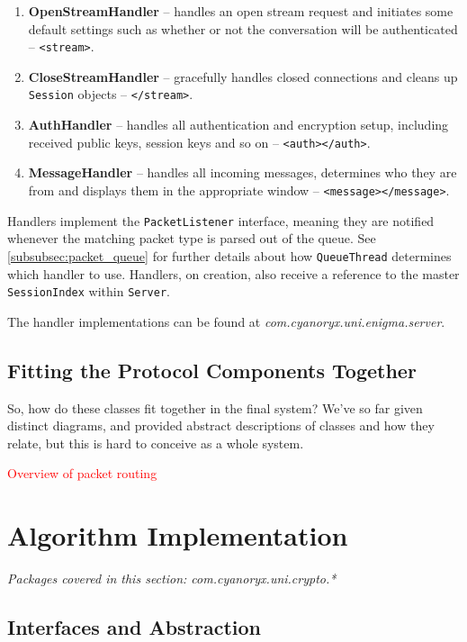     \begin{enumerate}
      \item \textbf{OpenStreamHandler} -- handles an open stream request and initiates some default settings such as whether or not the conversation will be authenticated -- \verb!<stream>!.
      \item \textbf{CloseStreamHandler} -- gracefully handles closed connections and cleans up \verb!Session! objects -- \verb!</stream>!.
      \item \textbf{AuthHandler} -- handles all authentication and encryption setup, including received public keys, session keys and so on -- \verb!<auth></auth>!.
      \item \textbf{MessageHandler} -- handles all incoming messages, determines who they are from and displays them in the appropriate window -- \verb!<message></message>!.
    \end{enumerate}
    
    Handlers implement the \verb!PacketListener! interface, meaning they are notified whenever the matching packet type is parsed out of the queue. See \textsection\ref{subsubsec:packet_queue} for further details about how \verb!QueueThread! determines which handler to use. Handlers, on creation, also receive a reference to the master \verb!SessionIndex! within \verb!Server!.
    
    The handler implementations can be found at \emph{com.cyanoryx.uni.enigma.server}.
    
    \subsection{Fitting the Protocol Components Together}
    \label{subsec:combined}
    
    So, how do these classes fit together in the final system? We've so far given distinct diagrams, and provided abstract descriptions of classes and how they relate, but this is hard to conceive as a whole system.
    
     \textcolor{red}{Overview of packet routing}

\section{Algorithm Implementation}
  \emph{Packages covered in this section: com.cyanoryx.uni.crypto.*}
  
  \subsection{Interfaces and Abstraction}
  
